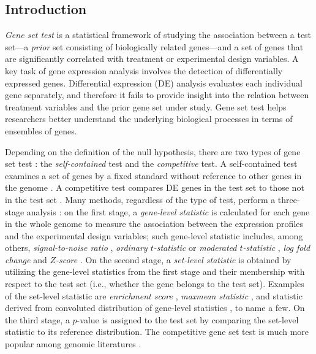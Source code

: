 	\subsection{Introduction}\label{section:introduction}
	
	\textit{Gene set test} is a statistical framework of studying the association between a test
	set---a \textit{prior} set consisting of biologically related genes---and a set of genes that 
	are
	significantly correlated with treatment or experimental design variables. A key task of gene
	expression analysis involves the detection of differentially expressed genes. Differential
	expression (DE) analysis  evaluates each individual gene separately, and therefore it fails to
	provide insight into the relation between treatment variables and the prior gene set under 
	study.
	Gene set test helps researchers better understand the underlying biological processes in terms 
	of
	ensembles of genes.
	
	Depending on the definition of the null hypothesis, there are two types of gene set test
	\citep{goeman2007analyzing}: the \textit{self-contained} test and the \textit{competitive} 
	test. A
	self-contained test examines a set of genes by a fixed standard without reference to other 
	genes in
	the genome 
	\citep{goeman2005testing,goeman2004global,huang2013gene,tsai2009multivariate,wu2010roast}. A 
	competitive test compares DE genes in the test set to those not in the test set 
	\citep{tian2005discovering,wu2012camera,yaari2013quantitative}. Many methods, regardless of the 
	type of test, perform a three-stage analysis
	\citep{khatri2012ten}: on the first stage, a \textit{gene-level statistic} is calculated for 
	each
	gene in the whole genome to measure the association between the expression profiles and the
	experimental design variables; such gene-level statistic includes, among others,
	\textit{signal-to-noise ratio} \citep{subramanian2005gene}, \textit{ordinary $t$-statistic}
	\citep{tian2005discovering} or \textit{moderated $t$-statistic} \citep{Smyth2004moderated},
	\textit{log fold change} \citep{kim2005page} and \textit{$Z$-score} 
	\citep{efron2007correlation}. On
	the second stage, a \textit{set-level statistic} is obtained by utilizing the gene-level 
	statistics
	from the first stage and their membership with respect to the test set (i.e., whether the gene
	belongs to the test set). Examples of the set-level statistic are \textit{enrichment score}
	\citep{subramanian2005gene}, \textit{maxmean statistic} \citep{efron2007testing}, and statistic
	derived from convoluted distribution of gene-level statistics \citep{yaari2013quantitative}, to 
	name
	a few. On the third stage, a $p$-value is assigned to the test set by comparing the set-level
	statistic to its reference distribution. The competitive gene set test is much more popular 
	among
	genomic literatures \citep{gatti2010heading,goeman2007analyzing}.  
	
